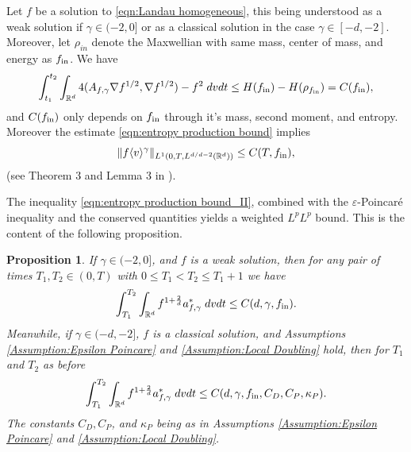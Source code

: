 \documentclass[12pt,american]{amsart}
\numberwithin{equation}{section}
\theoremstyle{plain}
\newtheorem{prop}[thm]{Proposition}
\theoremstyle{definition}                  %
\def\fin{f_{\textnormal{in}}}
\begin{document}
 
  Let $f$ be a solution to \eqref{eqn:Landau homogeneous}, this being understood as a weak solution if $\gamma \in (-2,0]$ or as a classical solution in the case $\gamma \in [-d,-2]$. Moreover, let $\rho_{in}$ denote the Maxwellian with same mass, center of mass, and energy as $\fin$. We have
  \begin{align}\label{eqn:entropy production bound}
    \int_{t_1}^{t_2}\int_{\mathbb{R}^d}4(A_{f,\gamma}\nabla f^{1/2},\nabla f^{1/2})-f^2\;dvdt \leq H(\fin) - H(\rho_{\fin}) = C(\fin),
  \end{align}	
  and $C(\fin)$ only depends on $\fin$ through it's mass, second moment, and entropy. Moreover the estimate \eqref{eqn:entropy production bound} implies 
  \begin{align}\label{eqn:entropy production bound_II}
  \| f \langle v \rangle^{\gamma}\|_{L^1(0,T,L^{d/d-2}(\mathbb{R}^d))} \le C(T,\fin),
  \end{align}
(see Theorem 3 and Lemma 3 in \cite{Desvillettes14}).
  
   
  
  
  
   The inequality \eqref{eqn:entropy production bound_II}, combined with the $\varepsilon$-Poincar\'e inequality and the conserved quantities yields a weighted $L^pL^p$ bound. This is the content of the following proposition.

\begin{prop}\label{prop:LpLp via interpolation with weight}  
  If $\gamma \in (-2,0]$, and $f$ is a weak solution, then for any pair of times $T_1,T_2 \in (0,T)$ with $0\leq T_1<T_2\leq T_1+1$ we have
  \begin{align*}
    \int_{T_1}^{T_2}\int_{\mathbb{R}^d} f^{1+\frac{2}{d}}a^*_{f,\gamma}\;dvdt \leq C(d,\gamma,\fin).
  \end{align*}	  
  Meanwhile, if $\gamma\in (-d,-2]$, $f$ is a classical solution, and Assumptions \ref{Assumption:Epsilon Poincare} and \ref{Assumption:Local Doubling} hold, then for $T_1$ and $T_2$ as before
  \begin{align*}
    \int_{T_1}^{T_2}\int_{\mathbb{R}^d} f^{1+\frac{2}{d}}a^*_{f,\gamma}\;dvdt \leq C(d,\gamma,\fin,C_D,C_P,\kappa_P).
  \end{align*}	  
  The constants $C_D,C_P$, and $\kappa_P$  being as in Assumptions \ref{Assumption:Epsilon Poincare} and \ref{Assumption:Local Doubling}.
\end{prop}
  
\end{document}
